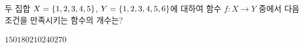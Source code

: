 두 집합 $X=\{1{,}\mkern3mu\mathopen{}2{,}\mkern3mu\mathopen{}3{,}\mkern3mu\mathopen{}4{,}\mkern3mu\mathopen{}5\}$, $Y=\{1{,}\mkern3mu\mathopen{}2{,}\mkern3mu\mathopen{}3{,}\mkern3mu\mathopen{}4{,}\mkern3mu\mathopen{}5{,}\mkern3mu\mathopen{}6\}$에 대하여 함수 $f:X\longrightarrow Y$ 중에서 다음 조건을 만족시키는 함수의 개수는? 
\begin{choices32}{$150$}{$180$}{$210$}{$240$}{$270$}\end{choices32}
